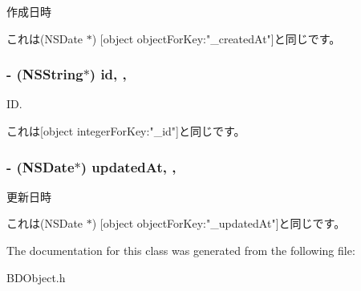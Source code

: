 作成日時 

これは(\-N\-S\-Date $\ast$) \mbox{[}object object\-For\-Key\-:"\-\_\-created\-At"\mbox{]}と同じです。 \hypertarget{interface_b_d_object_aa753599ab0726dcd36d8a3abd37281e2}{
\subsubsection[{id}]{\setlength{\rightskip}{0pt plus 5cm}-\/ (N\-S\-String$\ast$) id\hspace{0.3cm}{\ttfamily [read]}, {\ttfamily [atomic]}, {\ttfamily [assign]}}}\label{interface_b_d_object_aa753599ab0726dcd36d8a3abd37281e2}


I\-D. 

これは\mbox{[}object integer\-For\-Key\-:"\-\_\-id"\mbox{]}と同じです。 \hypertarget{interface_b_d_object_a3b6c8264a059fb29f59829903c02a81f}{
\subsubsection[{updated\-At}]{\setlength{\rightskip}{0pt plus 5cm}-\/ (N\-S\-Date$\ast$) updated\-At\hspace{0.3cm}{\ttfamily [read]}, {\ttfamily [atomic]}, {\ttfamily [assign]}}}\label{interface_b_d_object_a3b6c8264a059fb29f59829903c02a81f}


更新日時 

これは(\-N\-S\-Date $\ast$) \mbox{[}object object\-For\-Key\-:"\-\_\-updated\-At"\mbox{]}と同じです。 

The documentation for this class was generated from the following file\-:\begin{DoxyCompactItemize}
\item 
B\-D\-Object.\-h\end{DoxyCompactItemize}
